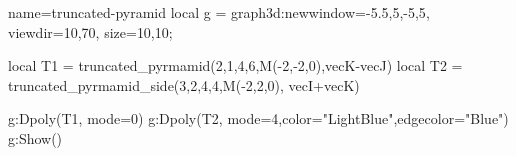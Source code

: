 \documentclass[12pt]{standalone}
\begin{document}
\begin{luadraw}{name=truncated-pyramid}
local g = graph3d:new{window={-5.5,5,-5,5}, viewdir={10,70}, size={10,10}};

local T1 = truncated_pyrmamid(2,1,4,6,M(-2,-2,0),vecK-vecJ)
local T2 = truncated_pyrmamid_side(3,2,4,4,M(-2,2,0), vecI+vecK)

g:Dpoly(T1, {mode=0})
g:Dpoly(T2, {mode=4,color="LightBlue",edgecolor="Blue"})
g:Show()
\end{luadraw}
\end{document}
